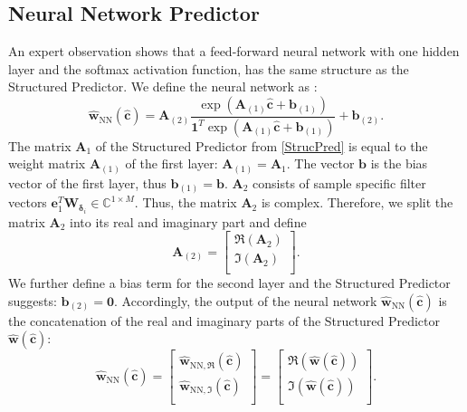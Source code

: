 \documentclass[12pt, draftclsnofoot, onecolumn]{IEEEtran}
\begin{document}
\subsection{Neural Network Predictor}
\label{sec:print}
An expert observation shows that a feed-forward neural network with one hidden layer and the softmax activation function, has the same structure as the Structured Predictor. We define the neural network as \cite{turan2019learning}:
\begin{equation}
\hat{\mathbf{w}}_{\text{NN}}(\hat{\mathbf{c}})  = \mathbf{A}_{(2)} \dfrac{ \exp{(\mathbf{A}_{(1)}\hat{\mathbf{c}}+ \mathbf{b}_{(1)} )} } { \mathbf{1}^T\exp{(\mathbf{A}_{(1)}\hat{\mathbf{c}}+ \mathbf{b}_{(1)})}} + \mathbf{b}_{(2)}. 
\end{equation}
The matrix $\mathbf{A}_1$ of the Structured Predictor from \eqref{StrucPred} is equal to the weight matrix $\mathbf{A}_{(1)}$ of the first layer: $\mathbf{A}_{(1)} = \mathbf{A}_1$.
The vector $\mathbf{b}$ is the bias vector of the first layer, thus $\mathbf{b}_{(1)} = \mathbf{b}$.
$\mathbf{A}_2$ consists of sample specific filter vectors $\mathbf{e}_1^T{\mathbf{W}}_{\boldsymbol{\delta}_i} \in \mathbb{C}^{1\times M}$. Thus, the matrix $\mathbf{A}_2$ is complex. Therefore, we split the matrix $\mathbf{A}_2$ into its real and imaginary part and define 
\begin{equation}
     \mathbf{A}_{(2)} = 
     \begin{bmatrix}
        \Re(\mathbf{A}_2) \\
        \Im(\mathbf{A}_2) \\
\end{bmatrix}.
\label{NN3}
\end{equation}
We further define a bias term for the second layer and the Structured Predictor suggests: $\mathbf{b}_{(2)} = \mathbf{0}$. Accordingly, the output of the neural network $\hat{\mathbf{w}}_{\text{NN}}(\hat{\mathbf{c}})$ is the concatenation of the real and imaginary parts of the Structured Predictor $\hat{\mathbf{w}}(\hat{\mathbf{c}})$:
\begin{equation}
    \hat{\mathbf{w}}_{\text{NN}}(\hat{\mathbf{c}}) = 
         \begin{bmatrix}
        \hat{\mathbf{w}}_{\text{NN},\Re}(\hat{\mathbf{c}}) \\
        \hat{\mathbf{w}}_{\text{NN},\Im}(\hat{\mathbf{c}}) \\
\end{bmatrix} = 
\begin{bmatrix}
        \Re(\hat{\mathbf{w}}(\hat{\mathbf{c}})) \\
        \Im(\hat{\mathbf{w}}(\hat{\mathbf{c}})) \\
\end{bmatrix}.
\end{equation}
\end{document}
